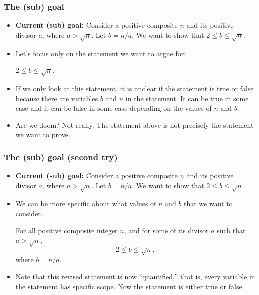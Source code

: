 \documentclass{beamer}
\begin{document}
\begin{frame}\frametitle{The (sub) goal}
  \begin{itemize}
  \item
    {\bf Current (sub) goal:} Consider a positive composite $n$ and its
    positive divisor $a$, where $a>\sqrt{n}$.  Let $b=n/a$.  We want
    to show that $2\leq b\leq\sqrt{n}$.
    \pause
  \item Let's focus only on the statement we want to argue for:
    \pause

    \begin{tcolorbox}
      \begin{center}
        $2\leq b\leq\sqrt{n}$.
      \end{center}
    \end{tcolorbox}
    
    \pause
  \item If we only look at this statement, it is unclear if the
    statement is true or false because there are variables $b$ and $n$
    in the statement.  It can be true in some case and it can be false
    in some case depending on the values of $n$ and $b$.

    \pause

  \item Are we doom? \pause Not really.  The statement above is not
    precisely the statement we want to prove.
  \end{itemize}
\end{frame}

\begin{frame}\frametitle{The (sub) goal (second try)}
  \begin{itemize}
  \item
    {\small {\bf Current (sub) goal:} Consider a positive composite $n$ and its
    positive divisor $a$, where $a>\sqrt{n}$.  Let $b=n/a$.  We want
    to show that $2\leq b\leq\sqrt{n}$.}

  \item We can be more specific about what values of $n$ and $b$ that
    we want to consider. \pause

    \begin{tcolorbox}[title=Revised statement]
      For all positive composite integer $n$, and for some of its
      divisor $a$ such that $a > \sqrt{n}$,
      \[ 2\leq b\leq\sqrt{n},\]
      where $b=n/a$.
    \end{tcolorbox}

  \item Note that this revised statement is now ``quantified,'' that
    is, every variable in the statement has specific scope.  Now the
    statement is either true or false.
  \end{itemize}
\end{frame}
\end{document}
